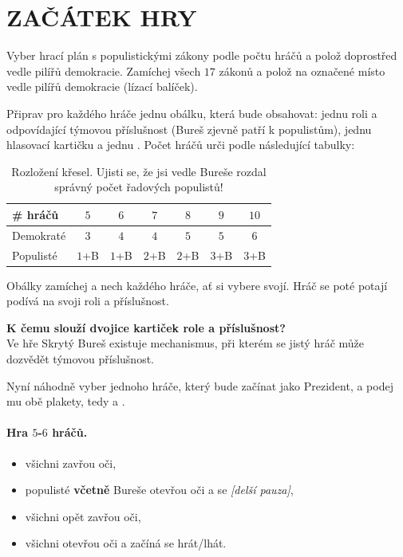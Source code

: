 \documentclass{article}
\newenvironment{redbox}{
    \vspace{1em}
    \color{red}\it
}
{
    \normalsize
    \vspace{1em}
}
\begin{document}
    \section*{ZAČÁTEK HRY}

    Vyber hrací plán s populistickými zákony podle počtu hráčů a polož doprostřed vedle pilířů demokracie. Zamíchej všech $17$ zákonů a polož na označené místo vedle pilířů demokracie (lízací balíček).

    Připrav pro každého hráče jednu obálku, kte\-rá bude obsahovat: jednu roli a odpovídající týmovou příslušnost (Bureš zjevně patří k populistům), jednu hlasovací kartičku  a jednu . Počet hráčů urči podle následující tabulky:
    \begin{table}[h]
    \begin{tabular}{l|c|c|c|c|c|c}
        \# hráčů & $5$ & $6$ & $7$ & $8$ & $9$ & $10$ \\\hline
        Demokraté & $3$ & $4$ & $4$ & $5$ & $5$ & $6$ \\
        Populisté & $1$+B & $1$+B & $2$+B & $2$+B & $3$+B & $3$+B
    \end{tabular}
    \caption{Rozložení křesel. Ujisti se, že jsi vedle Bureše rozdal správný počet řadových populistů!}
    \end{table}

    Obálky zamíchej a nech každého hráče, ať si vybere svojí. Hráč se poté potají podívá na svoji roli a příslušnost.

    \newpage

    \begin{redbox}
        {\bf\noindent K čemu slouží dvojice kartiček role a pří\-sluš\-nost?}\\[.5em]
        Ve hře Skrytý Bureš existuje mechanismus, při kterém se jistý hráč může dozvědět týmovou pří\-sluš\-nost. %
    \end{redbox}

    Nyní náhodně vyber jednoho hráče, který bude začínat jako Prezident, a podej mu obě plakety, tedy  a .

    \paragraph{Hra $5$-$6$ hráčů.}
    \begin{itemize}
        \item všichni zavřou oči,
        \item populisté {\bf včetně} Bureše otevřou oči a  se {\it [delší pauza]},
        \item všichni opět zavřou oči,
        \item všichni otevřou oči a začíná se hrát/lhát.
    \end{itemize}
\end{document}
